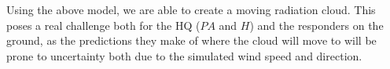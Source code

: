 Using the above model, we are able to create a moving radiation cloud. This poses a real challenge both for the HQ ($PA$ and $H$) and the responders on the ground, as the predictions they make of where the cloud will move to will be prone to uncertainty both due to the simulated wind speed and direction. 


%

